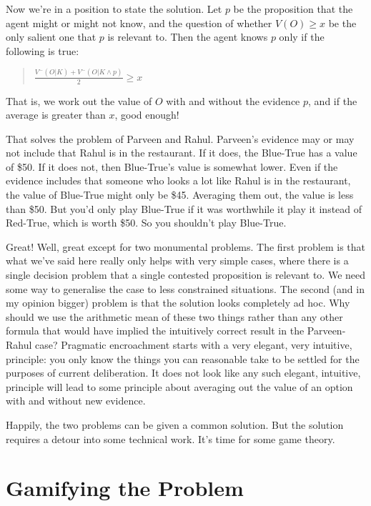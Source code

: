 Now we're in a position to state the solution. Let $p$ be the proposition that the agent might or might not know, and the question of whether $V(O) \geq x$ be the only salient one that $p$ is relevant to. Then the agent knows $p$ only if the following is true:

\begin{quote}

$\frac{V^-(O | K) + V^-(O | K \wedge p)}{2} \geq x$
\end{quote}
That is, we work out the value of $O$ with and without the evidence $p$, and if the average is greater than $x$, good enough!

That solves the problem of Parveen and Rahul. Parveen's evidence may or may not include that Rahul is in the restaurant. If it does, the Blue-True has a value of \$50. If it does not, then Blue-True's value is somewhat lower. Even if the evidence includes that someone who looks a lot like Rahul is in the restaurant, the value of Blue-True might only be \$45. Averaging them out, the value is less than \$50. But you'd only play Blue-True if it was worthwhile it play it instead of Red-True, which is worth \$50. So you shouldn't play Blue-True.

Great! Well, great except for two monumental problems. The first problem is that what we've said here really only helps with very simple cases, where there is a single decision problem that a single contested proposition is relevant to. We need some way to generalise the case to less constrained situations. The second (and in my opinion bigger) problem is that the solution looks completely ad hoc. Why should we use the arithmetic mean of these two things rather than any other formula that would have implied the intuitively correct result in the Parveen-Rahul case? Pragmatic encroachment starts with a very elegant, very intuitive, principle: you only know the things you can reasonable take to be settled for the purposes of current deliberation. It does not look like any such elegant, intuitive, principle will lead to some principle about averaging out the value of an option with and without new evidence.

Happily, the two problems can be given a common solution. But the solution requires a detour into some technical work. It's time for some game theory.

\section{Gamifying the Problem}
\label{gamifyingtheproblem}

